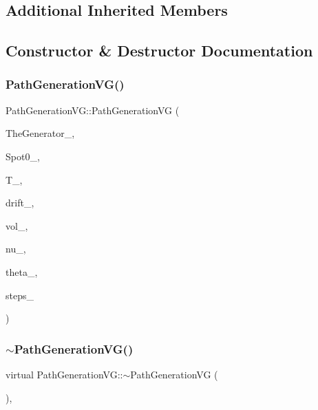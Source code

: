 \subsection*{Additional Inherited Members}


\subsection{Constructor \& Destructor Documentation}
\hypertarget{classPathGenerationVG_acc238316e8737283347c3ce19a72164d}{}\label{classPathGenerationVG_acc238316e8737283347c3ce19a72164d} 
\subsubsection{\texorpdfstring{Path\+Generation\+V\+G()}{PathGenerationVG()}}
{\footnotesize\ttfamily Path\+Generation\+V\+G\+::\+Path\+Generation\+VG (\begin{DoxyParamCaption}\item[{shared\+\_\+ptr$<$ \hyperlink{classRandomBase}{Random\+Base} $>$ \&}]{The\+Generator\+\_\+,  }\item[{double}]{Spot0\+\_\+,  }\item[{double}]{T\+\_\+,  }\item[{const \hyperlink{classParameters}{Parameters} \&}]{drift\+\_\+,  }\item[{const \hyperlink{classParameters}{Parameters} \&}]{vol\+\_\+,  }\item[{double}]{nu\+\_\+,  }\item[{double}]{theta\+\_\+,  }\item[{unsigned long}]{steps\+\_\+ }\end{DoxyParamCaption})}

\hypertarget{classPathGenerationVG_aaedfa54f5f956ab4027822d035d39077}{}\label{classPathGenerationVG_aaedfa54f5f956ab4027822d035d39077} 
\subsubsection{\texorpdfstring{$\sim$\+Path\+Generation\+V\+G()}{~PathGenerationVG()}}
{\footnotesize\ttfamily virtual Path\+Generation\+V\+G\+::$\sim$\+Path\+Generation\+VG (\begin{DoxyParamCaption}{ }\end{DoxyParamCaption})\hspace{0.3cm}{\ttfamily [inline]}, {\ttfamily [virtual]}}



